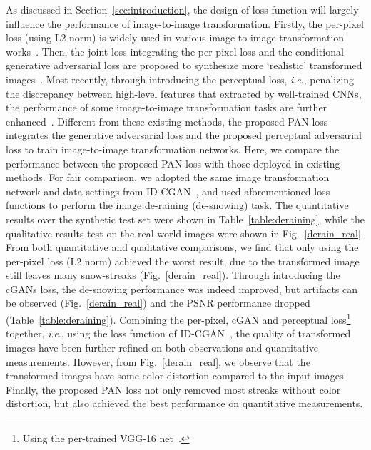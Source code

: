 \documentclass{article}
\newcommand{\ie}{\textit{i}.\textit{e}.}
\begin{document}
As discussed in Section~\ref{sec:introduction}, the design of loss function will largely influence the performance of image-to-image transformation. Firstly, the per-pixel loss (using L2 norm) is widely used in various image-to-image transformation works~\cite{tatarchenko2016multi,dong2014learning,kingma2013auto}. Then, the joint loss integrating the per-pixel loss and the conditional generative adversarial loss are proposed to synthesize more `realistic' transformed images~\cite{pathak2016context,isola2016image}. Most recently, through introducing the perceptual loss, \ie, penalizing the discrepancy between high-level features that extracted by well-trained CNNs, the performance of some image-to-image transformation tasks are further enhanced~\cite{ledig2016photo,johnson2016perceptual,zhang2017image}. Different from these existing methods, the proposed PAN loss integrates the generative adversarial loss and the proposed perceptual adversarial loss to train image-to-image transformation networks. Here, we compare the performance between the proposed PAN loss with those deployed in existing methods. 
For fair comparison, we adopted the same image transformation network and data settings from ID-CGAN~\cite{zhang2017image}, and used aforementioned loss functions to perform the image de-raining (de-snowing) task. 
The quantitative results over the synthetic test set were shown in Table~\ref{table:deraining}, while the qualitative results test on the real-world images were shown in Fig.~\ref{derain_real}. 
From both quantitative and qualitative comparisons, we find that only using the per-pixel loss (L2 norm) achieved the worst result, due to the transformed image still leaves many snow-streaks (Fig.~\ref{derain_real}). Through introducing the cGANs loss, the de-snowing performance was indeed improved, but artifacts can be observed (Fig.~\ref{derain_real}) and the PSNR performance dropped (Table~\ref{table:deraining}). Combining the per-pixel,  cGAN and perceptual loss\footnote{Using the per-trained VGG-16 net~\cite{simonyan2014very}.} together, \ie, using the loss function of ID-CGAN~\cite{zhang2017image}, the quality of transformed images have been further refined on both observations and quantitative measurements. However, from Fig.~\ref{derain_real}, we observe that the transformed images have some color distortion compared to the input images. Finally, the proposed PAN loss not only removed most streaks without color distortion, but also achieved the best performance on quantitative measurements. 
\end{document}
